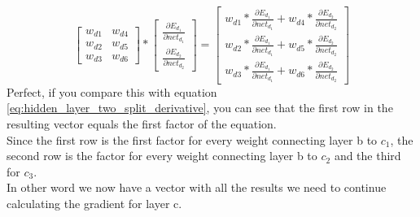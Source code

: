 \documentclass[11pt, halfparskip]{article}
\begin{document}
    \[
    	\begin{bmatrix}
    		w_{d1} & w_{d4}\\
            	w_{d2} & w_{d5}\\
            	w_{d3} & w_{d6}
    	\end{bmatrix}
    	*
    	\begin{bmatrix}
    		\frac{\partial E_{d_1}}{\partial net_{d_1}}\\
    		\frac{\partial E_{d_2}}{\partial net_{d_2}}
    	\end{bmatrix}
    	=
    	\begin{bmatrix}
    		w_{d1} * \frac{\partial E_{d_1}}{\partial net_{d_1}} + w_{d4} * \frac{\partial E_{d_2}}{\partial net_{d_2}}\\
    		w_{d2 }* \frac{\partial E_{d_1}}{\partial net_{d_1}} + w_{d5} * \frac{\partial E_{d_2}}{\partial net_{d_2}}\\
    		w_{d3} * \frac{\partial E_{d_1}}{\partial net_{d_1}} + w_{d6} * \frac{\partial E_{d_2}}{\partial net_{d_2}}
    	\end{bmatrix}
    \]
    Perfect, if you compare this with equation \ref{eq:hidden_layer_two_split_derivative}, you can see that the first row in the resulting vector equals the first factor of the equation.\\
    Since the first row is the first factor for every weight connecting layer b to $c_1$, the second row is the factor for every weight connecting layer b to $c_2$ and the third for $c_3$.\\
    In other word we now have a vector with all the results we need to continue calculating the gradient for layer c.
    
\end{document}
